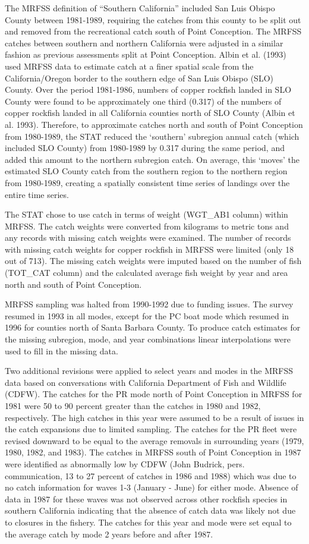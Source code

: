 \documentclass[11pt,
  english,
  letterpaper,
]{article}
\begin{document}
The MRFSS definition of ``Southern California'' included San Luis Obispo County between 1981-1989, requiring the catches from this county to be split out and removed from the recreational catch south of Point Conception. The MRFSS catches between southern and northern California were adjusted in a similar fashion as previous assessments split at Point Conception. Albin et al. (1993) used MRFSS data to estimate catch at a finer spatial scale from the California/Oregon border to the southern edge of San Luis Obispo (SLO) County. Over the period 1981-1986, numbers of copper rockfish landed in SLO County were found to be approximately one third (0.317) of the numbers of copper rockfish landed in all California counties north of SLO County (Albin et al. 1993). Therefore, to approximate catches north and south of Point Conception from 1980-1989, the STAT reduced the `southern' subregion annual catch (which included SLO County) from 1980-1989 by 0.317 during the same period, and added this amount to the northern subregion catch. On average, this `moves' the estimated SLO County catch from the southern region to the northern region from 1980-1989, creating a spatially consistent time series of landings over the entire time series.

The STAT chose to use catch in terms of weight (WGT\_AB1 column) within MRFSS. The catch weights were converted from kilograms to metric tons and any records with missing catch weights were examined. The number of records with missing catch weights for copper rockfish in MRFSS were limited (only 18 out of 713). The missing catch weights were imputed based on the number of fish (TOT\_CAT column) and the calculated average fish weight by year and area north and south of Point Conception.

MRFSS sampling was halted from 1990-1992 due to funding issues. The survey resumed in 1993 in all modes, except for the PC boat mode which resumed in 1996 for counties north of Santa Barbara County. To produce catch estimates for the missing subregion, mode, and year combinations linear interpolations were used to fill in the missing data.

Two additional revisions were applied to select years and modes in the MRFSS data based on conversations with California Department of Fish and Wildlife (CDFW). The catches for the PR mode north of Point Conception in MRFSS for 1981 were 50 to 90 percent greater than the catches in 1980 and 1982, respectively. The high catches in this year were assumed to be a result of issues in the catch expansions due to limited sampling. The catches for the PR fleet were revised downward to be equal to the average removals in surrounding years (1979, 1980, 1982, and 1983). The catches in MRFSS south of Point Conception in 1987 were identified as abnormally low by CDFW (John Budrick, pers. communication, 13 to 27 percent of catches in 1986 and 1988) which was due to no catch information for waves 1-3 (January - June) for either mode. Absence of data in 1987 for these waves was not observed across other rockfish species in southern California indicating that the absence of catch data was likely not due to closures in the fishery. The catches for this year and mode were set equal to the average catch by mode 2 years before and after 1987.
\end{document}
